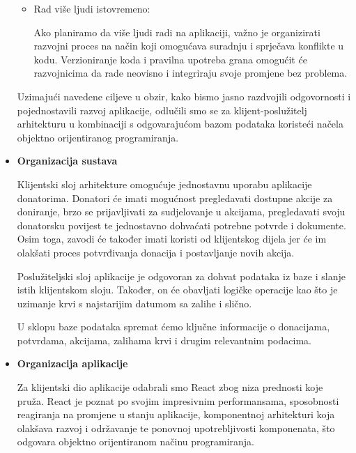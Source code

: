 \begin{itemize}
\begin{itemize}
	      	\item Rad više ljudi istovremeno:
	      	      	      	      
	      	      Ako planiramo da više ljudi radi na aplikaciji, važno je organizirati
	      	      razvojni proces na način koji omogućava suradnju i sprječava konflikte
	      	      u kodu. Verzioniranje koda i pravilna upotreba
	      	      grana omogućit će razvojnicima da rade neovisno i integriraju svoje
	      	      promjene bez problema.
	      \end{itemize}
	      	      
	      Uzimajući navedene ciljeve u obzir, kako bismo jasno razdvojili odgovornosti
	      i pojednostavili razvoj aplikacije, odlučili smo se za klijent-poslužitelj
	      arhitekturu u kombinaciji s odgovarajućom bazom podataka koristeći načela
	      objektno orijentiranog programiranja.
	      	      
	\item \textbf{Organizacija sustava}
	      	      
	      Klijentski sloj arhitekture omogućuje jednostavnu uporabu aplikacije donatorima.
	      Donatori će imati mogućnost pregledavati dostupne akcije za doniranje, brzo
	      se prijavljivati za sudjelovanje u akcijama, pregledavati svoju donatorsku
	      povijest te jednostavno dohvaćati potrebne potvrde i dokumente. Osim toga,
	      zavodi će također imati koristi od klijentskog dijela jer će im olakšati
	      proces potvrđivanja donacija i postavljanje novih akcija.
	      	      
	      Poslužiteljski sloj aplikacije je odgovoran za dohvat podataka iz baze i
	      slanje istih klijentskom sloju. Također, on će obavljati logičke operacije
	      kao što je uzimanje krvi s najstarijim datumom sa zalihe i slično.
	      	      
	      U sklopu baze podataka spremat ćemo ključne informacije o donacijama, potvrdama,
	      akcijama, zalihama krvi i drugim relevantnim podacima.
	      	      
	\item \textbf{Organizacija aplikacije}
	      	      
	      Za klijentski dio aplikacije odabrali smo React zbog niza prednosti koje pruža.
	      React je poznat po svojim impresivnim performansama, sposobnosti reagiranja
	      na promjene u stanju aplikacije, komponentnoj arhitekturi koja olakšava
	      razvoj i održavanje te ponovnoj upotrebljivosti komponenata, što odgovara objektno
	      orijentiranom načinu programiranja.
	      	      

\end{itemize}
